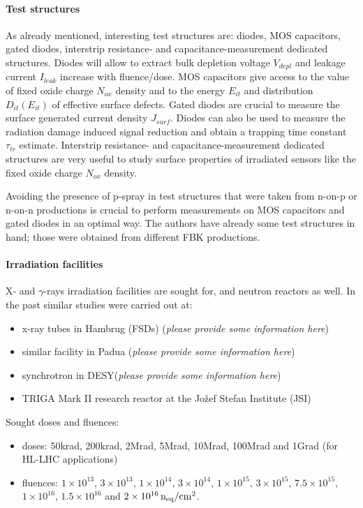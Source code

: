 \documentclass[dvips,12pt]{article}
\begin{document}
\paragraph{Test structures} As already mentioned, interesting test structures are: diodes, MOS 
capacitors, gated diodes, interstrip resistance- and 
capacitance-measurement dedicated structures.
Diodes will allow to extract bulk depletion voltage $V_{depl}$ and leakage current $I_{leak}$
 increase with fluence/dose. 
MOS capacitors give access to the value of fixed oxide charge $N_{ox}$ density and to the energy 
 $E_{it}$ and distribution  $D_{it}(E_{it})$ of effective surface defects. Gated diodes 
are crucial to measure the surface generated current density $J_{surf}$. 
Diodes can also be used to measure the radiation damage induced signal reduction and obtain 
a trapping time constant $\tau_{tr}$ estimate. Interstrip resistance- and 
capacitance-measurement dedicated structures are very useful to study surface properties 
of irradiated sensors like the fixed oxide charge $N_{ox}$ density.

\noindent Avoiding the presence of p-spray in test structures that were taken from
 n-on-p or n-on-n productions is crucial to perform measurements on MOS 
capacitors and gated diodes in an optimal way.
\noindent The authors have already some test structures in hand; those  were obtained from different 
FBK productions. 

\paragraph{Irradiation facilities}
X- and $\gamma$-rays irradiation facilities are sought for, and neutron reactors as well.
In the past similar studies were carried out at:
\begin{itemize}
\item x-ray tubes in Hambrug (FSDs) ({\it please provide some information here})
\item similar facility in Padua ({\it please provide some information here})
\item synchrotron in DESY({\it please provide some information here})
\item TRIGA Mark II research reactor at the Jo\v{z}ef Stefan Institute (JSI)  
\end{itemize}
\noindent Sought doses and fluences:
\begin{itemize}
\item doses: 50krad, 200krad, 2Mrad, 5Mrad, 10Mrad, 100Mrad and 1Grad (for HL-LHC 
applications)
\item fluences: $1\times10^{13}$,  $3\times10^{13}$, $1\times10^{14}$, $3\times10^{14}$, 
$1\times10^{15}$, $3\times10^{15}$, $7.5\times10^{15}$, $1\times10^{16}$, $1.5\times10^{16}$ and 
$2\times10^{16}\,{\rm n_{eq}/cm^2}$.
\end{itemize}
\end{document}
